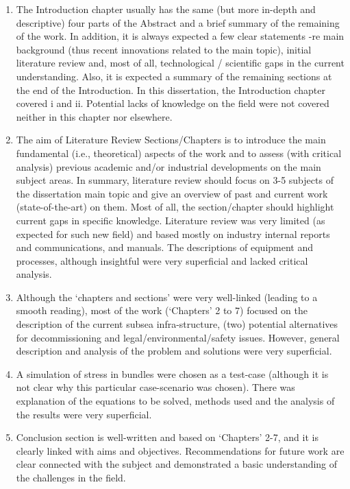\documentclass[14pt,twoside]{report}
\begin{document}
\begin{enumerate}
\begin{enumerate}
                   \item The Introduction chapter usually has the same (but more in-depth and descriptive) four parts of the Abstract and a brief summary of the remaining of the work. In addition, it is always expected a few clear statements -re main background (thus recent innovations related to the main topic), initial literature review and, most of all, technological / scientific gaps in the current understanding. Also, it is expected a summary of the remaining sections at the end of the Introduction. In this dissertation, the Introduction chapter covered i and ii.  Potential lacks of knowledge on the field were not covered neither in this chapter nor elsewhere. 
                   \item The aim of Literature Review Sections/Chapters is to introduce the main fundamental (i.e., theoretical) aspects of the work and to assess (with critical analysis) previous academic and/or industrial developments on the main subject areas. In summary, literature review should focus on 3-5 subjects of the dissertation main topic and give an overview of past and current work (state-of-the-art) on them. Most of all, the section/chapter should highlight current gaps in specific knowledge. Literature review was very limited (as expected for such new field) and based mostly on industry internal reports and communications, and manuals. The descriptions of equipment and processes, although insightful were very superficial and lacked critical analysis.
                   \item Although the `chapters and sections' were very well-linked (leading to a smooth reading), most of the work (`Chapters' 2 to 7) focused on the description of the current subsea infra-structure, (two) potential alternatives for decommissioning and legal/environmental/safety issues. However, general description and analysis of the problem and solutions were very superficial.
                   \item A simulation of stress in bundles were chosen as a test-case (although it is not clear why this particular case-scenario was chosen). There was explanation of the equations to be solved, methods used and the analysis of the results were very superficial.
                   \item Conclusion section is well-written and based on `Chapters' 2-7, and it is clearly linked with aims and objectives. Recommendations for future work are clear connected with the subject and demonstrated a basic understanding of the challenges in the field. 

\end{enumerate}
\end{enumerate}
\end{document}
